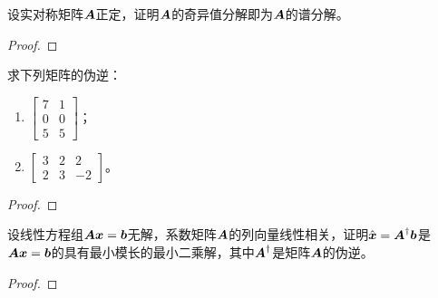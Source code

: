 \begin{problem}
设实对称矩阵\(\boldsymbol{A}\)正定，证明\(\boldsymbol{A}\)的奇异值分解即为\(\boldsymbol{A}\)的谱分解。
\end{problem}
\begin{proof}
\end{proof}

\begin{problem}
求下列矩阵的伪逆：
\begin{enumerate}
    \item \(\begin{bmatrix}7&1\\0&0\\5&5\end{bmatrix}\)；
    \item \(\begin{bmatrix}3&2&2\\2&3&-2\end{bmatrix}\)。
\end{enumerate}
\end{problem}
\begin{proof}
\end{proof}

\begin{problem}
设线性方程组\(\boldsymbol{A}\boldsymbol{x}=\boldsymbol{b}\)无解，系数矩阵\(\boldsymbol{A}\)的列向量线性相关，证明\(\hat{\boldsymbol{x}}=\boldsymbol{A}^\dagger\boldsymbol{b}\)是\(\boldsymbol{A}\boldsymbol{x}=\boldsymbol{b}\)的具有最小模长的最小二乘解，其中\(\boldsymbol{A}^\dagger\)是矩阵\(\boldsymbol{A}\)的伪逆。
\end{problem}
\begin{proof}
\end{proof}